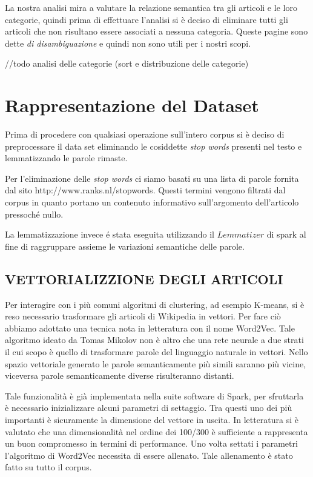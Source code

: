 \documentclass[
	12pt, %
	a4paper, %
	oneside, %
	headinclude,footinclude, %
	BCOR5mm, %
]{scrartcl}
\begin{document}
	La nostra analisi mira a valutare la relazione semantica tra gli articoli e le loro categorie, quindi prima di effettuare l'analisi si è deciso di eliminare tutti gli articoli che non risultano essere associati a nessuna categoria. Queste pagine sono dette \emph{di disambiguazione} e quindi non sono utili per i nostri scopi.

	//todo analisi delle categorie (sort e distribuzione delle categorie)

\section{Rappresentazione del Dataset}
	Prima di procedere con qualsiasi operazione sull'intero corpus si è deciso di preprocessare il data set eliminando le cosiddette \emph{stop words} presenti nel testo e lemmatizzando le parole rimaste.
	
	Per l'eliminazione delle \emph{stop words} ci siamo basati su una lista di parole fornita dal sito http://www.ranks.nl/stopwords. 
	Questi termini vengono filtrati dal corpus in quanto portano un contenuto informativo sull'argomento dell'articolo pressoch\'{e} nullo.
	
	La lemmatizzazione invece \'{e} stata eseguita utilizzando il $Lemmatizer$ di spark al fine di raggruppare assieme le variazioni semantiche delle parole.
	
	\subsection{VETTORIALIZZIONE DEGLI ARTICOLI}

        Per interagire con i più comuni algoritmi di clustering, ad esempio K-means, si è reso necessario trasformare
        gli articoli di Wikipedia in vettori.
        Per fare ciò abbiamo adottato una tecnica nota in letteratura con il nome Word2Vec. Tale algoritmo ideato da
        Tomas Mikolov non è altro che una rete neurale a due strati il cui scopo è quello di trasformare parole del
        linguaggio naturale in vettori. Nello spazio vettoriale generato le parole semanticamente più simili
        saranno più vicine, viceversa parole semanticamente diverse risulteranno distanti.

        Tale funzionalità è già implementata nella suite software di Spark,
        per sfruttarla è necessario inizializzare alcuni parametri di settaggio. Tra questi uno dei più importanti
        è sicuramente la dimensione del vettore in uscita. In letteratura si è valutato che una dimensionalità
        nel ordine dei 100/300 \cite{w2vdim}
        è sufficiente a rappresenta un buon compromesso in termini di performance.
        Uno volta settati i parametri l'algoritmo di Word2Vec necessita di essere allenato. Tale allenamento è stato
        fatto su tutto il corpus.
\end{document}
